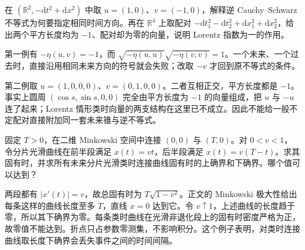 \begin{exercise}\label{g3:ex:A-reverse-cauchy-boundary}
	在 \((\mathbb R^2,-\mathrm dt^2+\mathrm dx^2)\) 中取 \(u=(1,0)\)、\(v=(-1,0)\)，解释逆 Cauchy--Schwarz 不等式为何要指定相同时间方向。再在 \(\mathbb R^4\) 上取配对 \(-\mathrm dt_1^2-\mathrm dt_2^2+\mathrm dx_1^2+\mathrm dx_2^2\)，给出两个平方长度均为 \(-1\)、配对却为零的向量，说明 Lorentz 指数为一的作用。
\end{exercise}
\begin{solution}
	第一例有 \(-\eta(u,v)=-1\)，而 \(\sqrt{-\eta(u,u)}\sqrt{-\eta(v,v)}=1\)。一个未来、一个过去时，直接沿用相同未来方向的符号就会失败；改取 \(-v\) 才回到原不等式的条件。

	第二例取 \(u=(1,0,0,0)\)、\(v=(0,1,0,0)\)。二者互相正交，平方长度都是 \(-1\)。事实上圆周 \((\cos s,\sin s,0,0)\) 完全由平方长度为 \(-1\) 的向量组成，把 \(u\) 与 \(-u\) 连了起来；Lorentz 情形类时向量的两支结构在这里已不成立。因此不能给一般不定配对直接附加同一套未来锥与逆不等式。
\end{solution}

\begin{exercise}\label{g3:ex:A-proper-time-infimum}
	固定 \(T>0\)，在二维 Minkowski 空间中连接 \((0,0)\) 与 \((T,0)\)。对 \(0<v<1\)，令分片光滑曲线在前半段满足 \(x(t)=vt\)，后半段满足 \(x(t)=v(T-t)\)。求其固有时，并求所有未来分片光滑类时连接曲线固有时的上确界和下确界。哪个值可以达到？
\end{exercise}
\begin{solution}
	两段都有 \(|x'(t)|=v\)，故总固有时为 \(T\sqrt{1-v^2}\)。正文的 Minkowski 极大性给出每条这样的曲线长度至多 \(T\)，直线 \(x=0\) 达到它。令 \(v\uparrow1\)，上述曲线的长度趋于零，所以其下确界为零。每条类时曲线在光滑非退化段上的固有时密度严格为正，故零值不能达到。折点只占参数零测集，不影响积分。这个例子表明，对类时连接曲线取长度下确界会丢失事件之间的时间间隔。
\end{solution}

